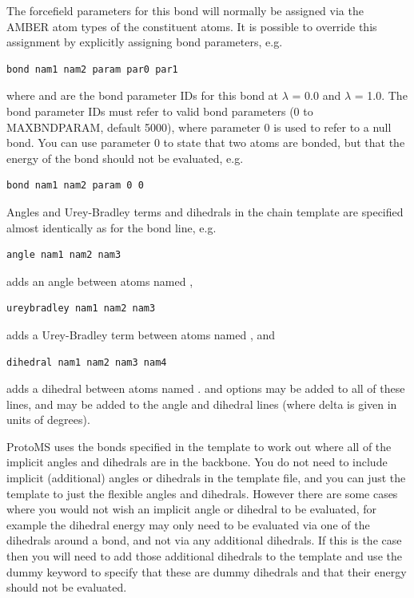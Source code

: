 \documentclass[letterpaper,10pt,english]{sphinxmanual}
\begin{document}
The forcefield parameters for this bond will normally be assigned via the AMBER atom types of the constituent atoms. It is possible to override this assignment by explicitly assigning bond parameters, e.g.

\begin{Verbatim}[commandchars=\\\{\}]
bond nam1 nam2 param par0 par1
\end{Verbatim}

where  and  are the bond parameter IDs for this bond at \(\lambda\) = 0.0 and \(\lambda\) = 1.0. The bond parameter IDs must refer to valid bond parameters (0 to MAXBNDPARAM, default 5000), where parameter 0 is used to refer to a null bond. You can use parameter 0 to state that two atoms are bonded, but that the energy of the bond should not be evaluated, e.g.

\begin{Verbatim}[commandchars=\\\{\}]
bond nam1 nam2 param 0 0
\end{Verbatim}

Angles and Urey-Bradley terms and dihedrals in the chain template are specified almost identically as for the bond line, e.g.

\begin{Verbatim}[commandchars=\\\{\}]
angle nam1 nam2 nam3
\end{Verbatim}

adds an angle between atoms named ,

\begin{Verbatim}[commandchars=\\\{\}]
ureybradley nam1 nam2 nam3
\end{Verbatim}

adds a Urey-Bradley term between atoms named , and

\begin{Verbatim}[commandchars=\\\{\}]
dihedral nam1 nam2 nam3 nam4
\end{Verbatim}

adds a dihedral between atoms named .  and  options may be added to all of these lines, and  may be added to the angle and dihedral lines (where delta is given in units of degrees).

ProtoMS uses the bonds specified in the template to work out where all of the implicit angles and dihedrals are in the backbone. You do not need to include implicit (additional) angles or dihedrals in the template file, and you can just the template to just the flexible angles and dihedrals. However there are some cases where you would not wish an implicit angle or dihedral to be evaluated, for example the dihedral energy may only need to be evaluated via one of the dihedrals around a bond, and not via any additional dihedrals. If this is the case then you will need to add those additional dihedrals to the template and use the dummy keyword to specify that these are dummy dihedrals and that their energy should not be evaluated.
\end{document}
